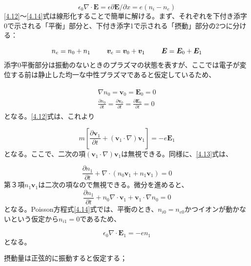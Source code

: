 \documentclass{ltjsarticle}
\numberwithin{equation}{section} %
\begin{document}
\begin{equation}
  \epsilon_0 \nabla \cdot \bm{E} = \epsilon \partial \bm{E}/ \partial x = e(n_i - n_e) \label{4.14}
\end{equation}
\eqref{4.12}～\eqref{4.14}式は線形化することで簡単に解ける。まず、それぞれを下付き添字0で示される「平衡」部分と、下付き添字1で示される「摂動」部分の2つに分ける：

\begin{equation}
  n_e = n_{0} + n_{1} \hspace{2pc} \bm{v}_e = \bm{v}_{0} + \bm{v}_{1} \hspace{2pc} \bm{E} = \bm{E}_0 + \bm{E}_{1} \label{4.15}
\end{equation}
添字0平衡部分は振動のないときのプラズマの状態を表すが、ここでは電子が変位する前は静止した均一な中性プラズマであると仮定しているため、


\begin{align}
  \begin{split}
    \nabla n_0 = \bm{v}_0 = \bm{E}_0 = 0\\
    \frac{\partial n_0}{\partial t} = \frac{\partial \bm{v}_0}{\partial t} = \frac{\partial \bm{E}_0}{\partial t} = 0
  \end{split} \label{4.16}
\end{align}
となる。\eqref{4.12}式は、これより

\begin{equation}
  m\left[\frac{\partial \bm{v}_1}{\partial t} + (\bm{v}_1 \cdot \nabla)\bm{v}_1\right] = -e\bm{E}_1 \label{4.17}
\end{equation}
となる。ここで、二次の項$(\bm{v}_1 \cdot \nabla)\bm{v}_1$は無視できる。同様に、\eqref{4.13}式は、

\[
  \frac{\partial n_1}{\partial t} + \nabla \cdot (n_0\bm{v}_1 + n_1\bm{v}_1) = 0 
\]
第３項$n_1\bm{v}_1$は二次の項なので無視できる。微分を進めると、
\begin{equation}
  \frac{\partial n_1}{\partial t} + n_0 \nabla \cdot \bm{v}_1 + \bm{v}_1 \cdot \nabla n_0 = 0 \label{4.18}
\end{equation}
となる。Poisson方程式\eqref{4.14}式では、平衡のとき、$n_{i0} = n_{e0}$かつイオンが動かないという仮定から$n_{i1} = 0$であるため、

\begin{equation}
  \epsilon_0 \nabla \cdot \bm{E}_1 = -en_1 \label{4.19}
\end{equation}
となる。

摂動量は正弦的に振動すると仮定する；
\end{document}
